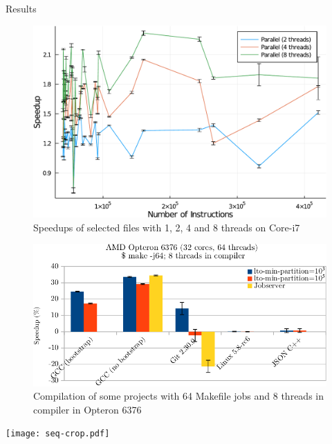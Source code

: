 \begin{subsection}{Results}
\begin{figure}
\includegraphics[scale=0.7]{figuras/times-speedup-crop.pdf}
\caption{Speedups of selected files with 1, 2, 4 and 8 threads on Core-i7}
\label{fig:gcc_all_files}
\end{figure}

\begin{figure}
\centering
	 \includegraphics[scale=1]{figuras/experiment_projects_new-crop.pdf}
	  \caption{Compilation of some projects with 64 Makefile jobs and 8 threads in compiler in Opteron 6376}
	  \label{fig:gcc_projects}
\end{figure}

\begin{landscape}
 \vspace*{-2cm}%
 \noindent%
 \hspace*{-2cm}%
    \texttt{[image: seq-crop.pdf]}
    \label{fig:analysis_classical}
\end{landscape}


\end{subsection}

